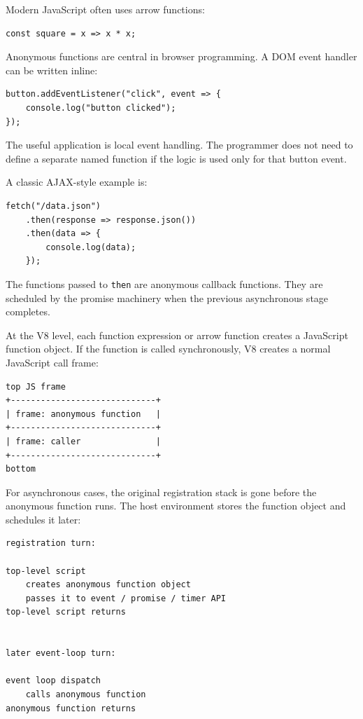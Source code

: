 \documentclass[a4paper,twoside]{report}
\begin{document}
Modern JavaScript often uses arrow functions:

\begin{verbatim}
const square = x => x * x;
\end{verbatim}

Anonymous functions are central in browser programming. A DOM event handler can be written inline:

\begin{verbatim}
button.addEventListener("click", event => {
    console.log("button clicked");
});
\end{verbatim}

The useful application is local event handling. The programmer does not need to define a separate named function if the logic is used only for that button event.

A classic AJAX-style example is:

\begin{verbatim}
fetch("/data.json")
    .then(response => response.json())
    .then(data => {
        console.log(data);
    });
\end{verbatim}

The functions passed to \texttt{then} are anonymous callback functions. They are scheduled by the promise machinery when the previous asynchronous stage completes.

At the V8 level, each function expression or arrow function creates a JavaScript function object. If the function is called synchronously, V8 creates a normal JavaScript call frame:

\begin{verbatim}
top JS frame
+-----------------------------+
| frame: anonymous function   |
+-----------------------------+
| frame: caller               |
+-----------------------------+
bottom
\end{verbatim}

For asynchronous cases, the original registration stack is gone before the anonymous function runs. The host environment stores the function object and schedules it later:

\begin{verbatim}
registration turn:

top-level script
    creates anonymous function object
    passes it to event / promise / timer API
top-level script returns


later event-loop turn:

event loop dispatch
    calls anonymous function
anonymous function returns
\end{verbatim}
\end{document}
